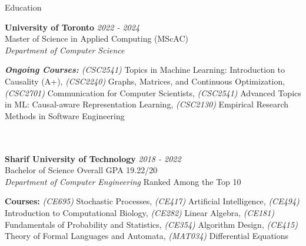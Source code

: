 \documentclass{resume} %
\begin{document}
\begin{rSection}{Education}

{\bf University of Toronto} \hfill \textcolor{Black!70}{\em 2022 - 2024} 
\\ \textcolor{Black!70}{Master of Science in Applied Computing (MScAC)}
\\ {\it Department of Computer Science}
\\
\begin{footnotesize}
{\it {\textcolor{Black!70}{\bf Ongoing Courses:}} (CSC2541)} Topics in Machine Learning: Introduction to Causality (A+), {\it (CSC2240)} Graphs, Matrices, and Continuous Optimization, {\it (CSC2701)} Communication for Computer Scientists,  {\it (CSC2541)} Advanced Topics in ML: Causal-aware Representation Learning, {\it (CSC2130)} Empirical Research Methods in Software Engineering
\end{footnotesize}
\\
\\
{\bf Sharif University of Technology} \hfill \textcolor{Black!70}{\em 2018 - 2022} 
\\ \textcolor{Black!70}{Bachelor of Science} \hfill \textcolor{Black!70}{ Overall GPA 19.22/20}
\\ {\it Department of Computer Engineering} \hfill \textcolor{Black!70}{Ranked Among the Top 10}
\\
\begin{footnotesize}
{\textcolor{Black!70}{\bf Courses:}} {\it (CE695)} Stochastic Processes, {\it (CE417)} Artificial Intelligence, {\it (CE494)} Introduction to Computational Biology, {\it (CE282)} Linear Algebra, {\it (CE181)} Fundamentals of Probability and Statistics, {\it (CE354)} Algorithm Design, {\it (CE415)} Theory of Formal Languages and Automata, {\it (MAT034)} Differential Equations
\end{footnotesize}



\end{rSection}
\end{document}
